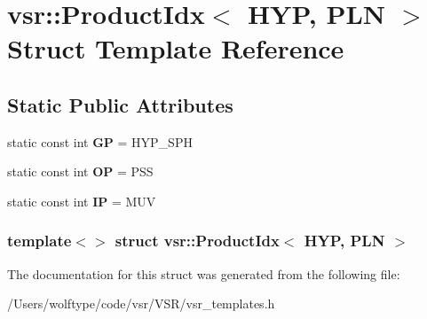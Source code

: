 \hypertarget{structvsr_1_1_product_idx_3_01_h_y_p_00_01_p_l_n_01_4}{\section{vsr\-:\-:Product\-Idx$<$ H\-Y\-P, P\-L\-N $>$ Struct Template Reference}
\label{structvsr_1_1_product_idx_3_01_h_y_p_00_01_p_l_n_01_4}
}
\subsection*{Static Public Attributes}
\begin{DoxyCompactItemize}
\item 
\hypertarget{structvsr_1_1_product_idx_3_01_h_y_p_00_01_p_l_n_01_4_afad2d31adc2755354f10fb559eb97d4f}{static const int {\bfseries G\-P} = H\-Y\-P\-\_\-\-S\-P\-H}\label{structvsr_1_1_product_idx_3_01_h_y_p_00_01_p_l_n_01_4_afad2d31adc2755354f10fb559eb97d4f}

\item 
\hypertarget{structvsr_1_1_product_idx_3_01_h_y_p_00_01_p_l_n_01_4_ac18c1756d51b360ee9bf14eb349425ee}{static const int {\bfseries O\-P} = P\-S\-S}\label{structvsr_1_1_product_idx_3_01_h_y_p_00_01_p_l_n_01_4_ac18c1756d51b360ee9bf14eb349425ee}

\item 
\hypertarget{structvsr_1_1_product_idx_3_01_h_y_p_00_01_p_l_n_01_4_a4f22e548e15f999110f3408ebc95575f}{static const int {\bfseries I\-P} = M\-U\-V}\label{structvsr_1_1_product_idx_3_01_h_y_p_00_01_p_l_n_01_4_a4f22e548e15f999110f3408ebc95575f}

\end{DoxyCompactItemize}
\subsubsection*{template$<$$>$ struct vsr\-::\-Product\-Idx$<$ H\-Y\-P, P\-L\-N $>$}



The documentation for this struct was generated from the following file\-:\begin{DoxyCompactItemize}
\item 
/\-Users/wolftype/code/vsr/\-V\-S\-R/vsr\-\_\-templates.\-h\end{DoxyCompactItemize}
